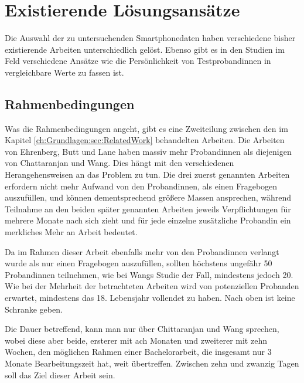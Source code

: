 \section{Existierende Lösungsansätze}
\label{ch:Analyse:sec:RelatedWork}

Die Auswahl der zu untersuchenden Smartphonedaten haben verschiedene bisher existierende Arbeiten unterschiedlich gelöst.
Ebenso gibt es in den Studien im Feld verschiedene Ansätze wie die Persönlichkeit von Testprobandinnen in vergleichbare Werte zu fassen ist.

\subsection{Rahmenbedingungen}

Was die Rahmenbedingungen angeht, gibt es eine Zweiteilung zwischen den im Kapitel \ref{ch:Grundlagen:sec:RelatedWork} behandelten Arbeiten.
Die Arbeiten von Ehrenberg, Butt und Lane haben massiv mehr Probandinnen als diejenigen von Chattaranjan und Wang.
Dies hängt mit den verschiedenen Herangehensweisen an das Problem zu tun.
Die drei zuerst genannten Arbeiten erfordern nicht mehr Aufwand von den Probandinnen, als einen Fragebogen auszufüllen, und können dementsprechend größere Massen ansprechen,
während Teilnahme an den beiden später genannten Arbeiten jeweils Verpflichtungen für mehrere Monate nach sich zieht und für jede einzelne zusätzliche Probandin ein merkliches Mehr an Arbeit bedeutet.
\par
Da im Rahmen dieser Arbeit ebenfalls mehr von den Probandinnen verlangt wurde als nur einen Fragebogen auszufüllen, sollten höchstens ungefähr 50 Probandinnen teilnehmen, wie bei Wangs Studie der Fall, mindestens jedoch 20.
Wie bei der Mehrheit der betrachteten Arbeiten wird von potenziellen Probanden erwartet, mindestens das 18. Lebensjahr vollendet zu haben. Nach oben ist keine Schranke geben.
\par
Die Dauer betreffend, kann man nur über Chittaranjan und Wang sprechen, wobei diese aber beide, ersterer mit ach Monaten und zweiterer mit zehn Wochen, den möglichen Rahmen einer Bachelorarbeit, die insgesamt nur 3 Monate Bearbeitungszeit hat, weit übertreffen.
Zwischen zehn und zwanzig Tagen soll das Ziel dieser Arbeit sein.

